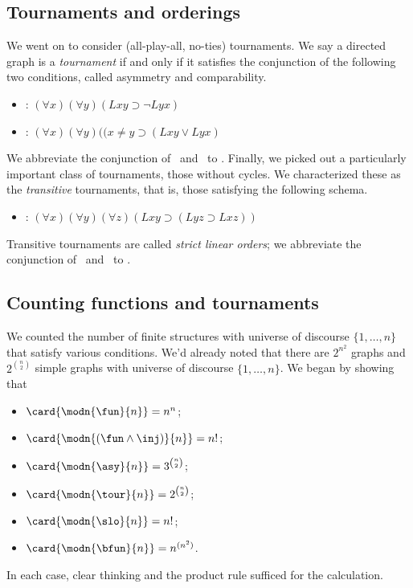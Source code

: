 \subsection{Tournaments and orderings}

We went on to consider (all-play-all, no-ties) tournaments. We say a directed graph is a \emph{tournament} if and only if it satisfies the conjunction of the following two conditions, called asymmetry and comparability. 
\begin{itemize}
\item \asy: $(\forall x)(\forall y)(Lxy\supset \neg Lyx)$
\item \comp: $(\forall x)(\forall y)((x\neq y\supset (Lxy\vee Lyx)$
\end{itemize}
We abbreviate the conjunction of \asy\ and \comp\ to \tour. Finally, we picked out a particularly important class of tournaments, those without cycles. We characterized these as the \emph{transitive} tournaments, that is, those satisfying the following schema.
\begin{itemize}
\item \trans: $(\forall x)(\forall y)(\forall z)(Lxy\supset(Lyz\supset Lxz))$
\end{itemize}
Transitive tournaments are called \emph{strict linear orders}; we abbreviate the conjunction of \tour\ and \trans\ to \slo.
\subsection{Counting functions and tournaments}

We counted the number of finite structures with universe of discourse $\{1,\ldots,n\}$ that satisfy various conditions. We'd already noted that there are $2^{n^2}$ graphs and $2^{\binom{n}{2}}$ simple graphs with universe of discourse $\{1,\ldots,n\}$. We began by showing that
\begin{itemize}
\item
$\card{\modn{\fun}{n}}= n^n$;
\item
$\card{\modn{(\fun\wedge\inj)}{n}}= n!$;
\item
$\card{\modn{\asy}{n}}= 3^{\binom{n}{2}}$;
\item
$\card{\modn{\tour}{n}}= 2^{\binom{n}{2}}$;
\item
$\card{\modn{\slo}{n}}= n!$;
\item
$\card{\modn{\bfun}{n}}= n^{(n^2)}$.
\end{itemize}
In each case, clear thinking and the product rule sufficed for the calculation. 
